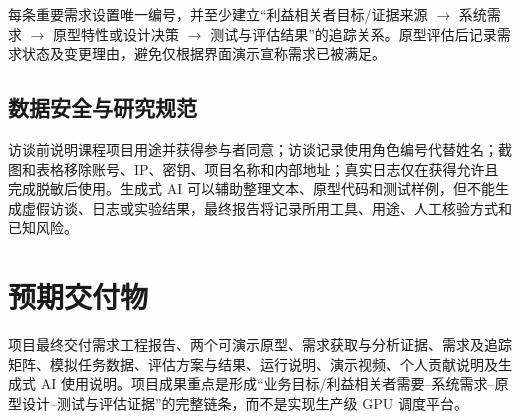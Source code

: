 \documentclass[UTF8,10.5pt,a4paper,fontset=mac]{ctexart}
\begin{document}
每条重要需求设置唯一编号，并至少建立“利益相关者目标/证据来源 $\rightarrow$ 系统需求 $\rightarrow$ 原型特性或设计决策 $\rightarrow$ 测试与评估结果”的追踪关系。原型评估后记录需求状态及变更理由，避免仅根据界面演示宣称需求已被满足。

\subsection{数据安全与研究规范}

访谈前说明课程项目用途并获得参与者同意；访谈记录使用角色编号代替姓名；截图和表格移除账号、IP、密钥、项目名称和内部地址；真实日志仅在获得允许且完成脱敏后使用。生成式 AI 可以辅助整理文本、原型代码和测试样例，但不能生成虚假访谈、日志或实验结果，最终报告将记录所用工具、用途、人工核验方式和已知风险。

\section*{预期交付物}

项目最终交付需求工程报告、两个可演示原型、需求获取与分析证据、需求及追踪矩阵、模拟任务数据、评估方案与结果、运行说明、演示视频、个人贡献说明及生成式 AI 使用说明。项目成果重点是形成“业务目标/利益相关者需要--系统需求--原型设计--测试与评估证据”的完整链条，而不是实现生产级 GPU 调度平台。
\end{document}
